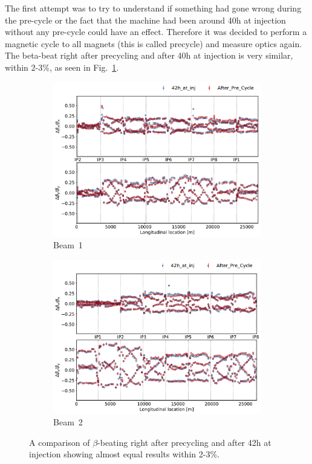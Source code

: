 \documentclass{cernatsnote}
\begin{document}
The first attempt was to try to understand if something had gone wrong during the pre-cycle or the fact that the machine had been around 40h at injection without any pre-cycle could have an effect. Therefore it was decided to perform a magnetic cycle to all magnets (this is called precycle) and measure optics again.
The beta-beat right after precycling and after 40h at injection is very similar, within 2-3\%, as seen in Fig.~\ref{fig:Inj_before_after_pre_cycle}.

\begin{figure}[ht]
\begin{subfigure}{.5\textwidth}
  \centering
  \includegraphics[width=.99\linewidth]{inj_linear/beamtest/beam1/beta_beat_before_after_pre_beam1.pdf}  
  \caption{Beam~1}
\end{subfigure}
\begin{subfigure}{.5\textwidth}
  \centering
  \includegraphics[width=.99\linewidth]{inj_linear/beamtest/beam2/beta_beat_before_after_pre_beam2.pdf}  
  \caption{Beam~2}
\end{subfigure}
\caption{A comparison of
$\beta$-beating right after precycling and after 42h at injection showing almost equal results within  2-3\%.}
\label{fig:Inj_before_after_pre_cycle}
\end{figure}
\end{document}
